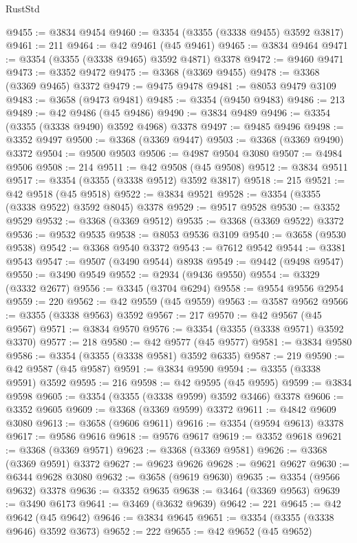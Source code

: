 \begin{lexlean}{RustStd}
\begin{coremodule}
@9455 := @3834 @9454
@9460 := @3354 (@3355 (@3338 @9455) @3592 @3817)
@9461 := 211
@9464 := @42 @9461 (@45 @9461)
@9465 := @3834 @9464
@9471 := @3354 (@3355 (@3338 @9465) @3592 @4871) @3378
@9472 := @9460 @9471
@9473 := @3352 @9472
@9475 := @3368 (@3369 @9455)
@9478 := @3368 (@3369 @9465) @3372
@9479 := @9475 @9478
@9481 := @8053 @9479 @3109
@9483 := @3658 (@9473 @9481)
@9485 := @3354 (@9450 @9483)
@9486 := 213
@9489 := @42 @9486 (@45 @9486)
@9490 := @3834 @9489
@9496 := @3354 (@3355 (@3338 @9490) @3592 @4968) @3378
@9497 := @9485 @9496
@9498 := @3352 @9497
@9500 := @3368 (@3369 @9447)
@9503 := @3368 (@3369 @9490) @3372
@9504 := @9500 @9503
@9506 := @4987 @9504 @3080
@9507 := @4984 @9506
@9508 := 214
@9511 := @42 @9508 (@45 @9508)
@9512 := @3834 @9511
@9517 := @3354 (@3355 (@3338 @9512) @3592 @3817)
@9518 := 215
@9521 := @42 @9518 (@45 @9518)
@9522 := @3834 @9521
@9528 := @3354 (@3355 (@3338 @9522) @3592 @8045) @3378
@9529 := @9517 @9528
@9530 := @3352 @9529
@9532 := @3368 (@3369 @9512)
@9535 := @3368 (@3369 @9522) @3372
@9536 := @9532 @9535
@9538 := @8053 @9536 @3109
@9540 := @3658 (@9530 @9538)
@9542 := @3368 @9540 @3372
@9543 := @7612 @9542
@9544 := @3381 @9543
@9547 := @9507 (@3490 @9544) @8938
@9549 := @9442 (@9498 @9547)
@9550 := @3490 @9549
@9552 := @2934 (@9436 @9550)
@9554 := @3329 (@3332 @2677)
@9556 := @3345 (@3704 @6294)
@9558 := @9554 @9556 @2954
@9559 := 220
@9562 := @42 @9559 (@45 @9559)
@9563 := @3587 @9562
@9566 := @3355 (@3338 @9563) @3592
@9567 := 217
@9570 := @42 @9567 (@45 @9567)
@9571 := @3834 @9570
@9576 := @3354 (@3355 (@3338 @9571) @3592 @3370)
@9577 := 218
@9580 := @42 @9577 (@45 @9577)
@9581 := @3834 @9580
@9586 := @3354 (@3355 (@3338 @9581) @3592 @6335)
@9587 := 219
@9590 := @42 @9587 (@45 @9587)
@9591 := @3834 @9590
@9594 := @3355 (@3338 @9591) @3592
@9595 := 216
@9598 := @42 @9595 (@45 @9595)
@9599 := @3834 @9598
@9605 := @3354 (@3355 (@3338 @9599) @3592 @3466) @3378
@9606 := @3352 @9605
@9609 := @3368 (@3369 @9599) @3372
@9611 := @4842 @9609 @3080
@9613 := @3658 (@9606 @9611)
@9616 := @3354 (@9594 @9613) @3378
@9617 := @9586 @9616
@9618 := @9576 @9617
@9619 := @3352 @9618
@9621 := @3368 (@3369 @9571)
@9623 := @3368 (@3369 @9581)
@9626 := @3368 (@3369 @9591) @3372
@9627 := @9623 @9626
@9628 := @9621 @9627
@9630 := @6344 @9628 @3080
@9632 := @3658 (@9619 @9630)
@9635 := @3354 (@9566 @9632) @3378
@9636 := @3352 @9635
@9638 := @3464 (@3369 @9563)
@9639 := @3490 @6173
@9641 := @3469 (@3632 @9639)
@9642 := 221
@9645 := @42 @9642 (@45 @9642)
@9646 := @3834 @9645
@9651 := @3354 (@3355 (@3338 @9646) @3592 @3673)
@9652 := 222
@9655 := @42 @9652 (@45 @9652)

\end{coremodule}
\end{lexlean}
